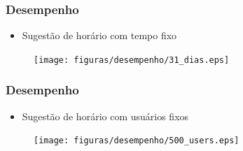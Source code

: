 \documentclass{beamer}
\begin{document}
\begin{frame}
\frametitle{Desempenho}

\begin{itemize}
	\item{Sugestão de horário com tempo fixo}
\end{itemize}

\begin{figure}[h]
	\centering
	\texttt{[image: figuras/desempenho/31\_dias.eps]}
\end{figure}

\end{frame}

\begin{frame}
\frametitle{Desempenho}

\begin{itemize}
	\item{Sugestão de horário com usuários fixos}
\end{itemize}

\begin{figure}[h]
	\centering
	\texttt{[image: figuras/desempenho/500\_users.eps]}
\end{figure}

\end{frame}
\end{document}
